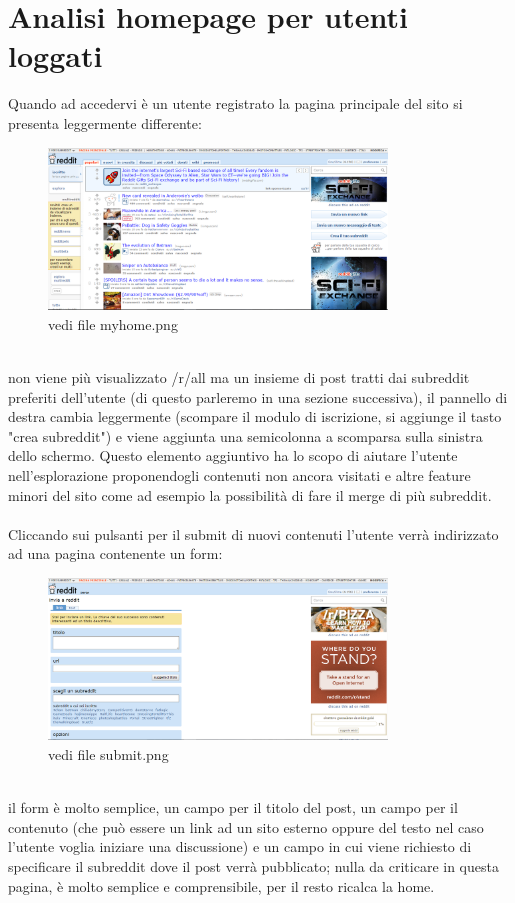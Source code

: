 \documentclass[12pt]{article}
\begin{document}
\section{Analisi homepage per utenti loggati}
Quando ad accedervi \`e un utente registrato la pagina principale del sito si presenta leggermente differente: \\
\begin{figure}[ht!]
\centering
\includegraphics[width=90mm]{myhome}
\caption{vedi file myhome.png}
\end{figure} \\
non viene pi\`u visualizzato /r/all ma un insieme di post tratti dai subreddit preferiti dell'utente (di questo parleremo in una sezione successiva), il pannello di destra cambia leggermente (scompare il modulo di iscrizione, si aggiunge il tasto "crea subreddit") e viene aggiunta una semicolonna a scomparsa sulla sinistra dello schermo. Questo elemento aggiuntivo ha lo scopo di aiutare l'utente nell'esplorazione proponendogli contenuti non ancora visitati e altre feature minori del sito come ad esempio la possibilit\`a di fare il merge di pi\`u subreddit. \\ \\ Cliccando sui pulsanti per il submit di nuovi contenuti l'utente verr\`a indirizzato ad una pagina contenente un form: \\
\begin{figure}[ht!]
\centering
\includegraphics[width=90mm]{submit}
\caption{vedi file submit.png}
\end{figure} \\
il form \`e molto semplice, un campo per il titolo del post, un campo per il contenuto (che pu\`o essere un link ad un sito esterno oppure del testo nel caso l'utente voglia iniziare una discussione) e un campo in cui viene richiesto di specificare il subreddit dove il post verr\`a pubblicato; nulla da criticare in questa pagina, \`e molto semplice e comprensibile, per il resto ricalca la home.
\\
\end{document}
